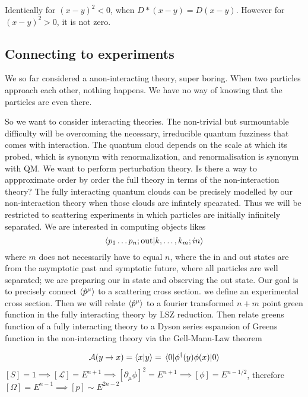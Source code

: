 Identically for $(x - y)^2 < 0$, when $D*(x - y) = D(x - y)$. However for $(x - y)^2 > 0$, it is not zero.



\subsection{Connecting to experiments}

We so far considered a anon-interacting theory, super boring. When two particles approach each other, nothing happens. We have no way of knowing that the particles are even there. 

So we want to consider interacting theories. The non-trivial but surmountable difficulty will be overcoming the necessary, irreducible quantum fuzziness that comes with interaction. The quantum cloud depends on the scale at which its probed, which is synonym with renormalization, and renormalisation is synonym with QM. We want to perform perturbation theory. Is there a way to appproximate order by order the full theory in terms of the non-interaction theory? The fully interacting quantum clouds can be precisely modelled by our non-interaction theory when those clouds are infintely spearated. Thus we will be restricted to scattering experiments in which particles are initially infinitely separated. 
 We are interested in computing objects likes
 \begin{equation}
     \expval{p_1 \dots p_n; \text{out}|  k, \dots , k_m; in}
 \end{equation}
where $m$ does not necessarily have to equal $n$, where the in and out states are from the asymptotic past and symptotic future, where all particles are well separated; we are preparing our in state and observing the out state. Our goal is to precisely connect $\expval{\hat{p}^\mu}$ to
a scattering cross section. we define an experimental cross section. Then we will relate $\expval{\hat{p}^\mu}$ to a fourier transformed $n+m$ point green function in the fully interacting theory by LSZ reduction. Then relate greens function of a fully interacting theory to a Dyson series espansion of Greens function in the non-interacting theory via  the Gell-Mann-Law theorem


\begin{equation}
    \mathcal{A} (y \to x) = \expval{x|y} = \mel{0}{\phi^{\dagger}  (y)  \phi(x) }{0}
\end{equation}
$[S]  =1 \implies [\mathcal{L}] = E^{n+1} \implies [\partial_\mu \phi]^2 = E^{n+1} \implies [\phi] = E^{n-1/2}$, therefore $[\Omega] = E^{n-1} \implies [p] \sim E^{2n-2}$


